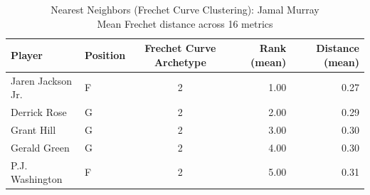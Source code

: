\begin{table}[t]
\caption*{
{\fontsize{20}{25} Nearest Neighbors (Frechet Curve Clustering): Jamal Murray\fontsize{12}{15}\selectfont } \\ 
{\fontsize{14}{17}\selectfont  Mean Frechet distance across 16 metrics\fontsize{12}{15}\selectfont }
} 
\fontsize{12.0pt}{14.0pt}\selectfont
\begin{tabular*}{\linewidth}{@{\extracolsep{\fill}}llcrr}
\toprule
Player & Position & Frechet Curve Archetype & Rank (mean) & Distance (mean) \\ 
\midrule\addlinespace[2.5pt]
Jaren Jackson Jr. & F & 2 & 1.00 & 0.27 \\ 
Derrick Rose & G & 2 & 2.00 & 0.29 \\ 
Grant Hill & G & 2 & 3.00 & 0.30 \\ 
Gerald Green & G & 2 & 4.00 & 0.30 \\ 
P.J. Washington & F & 2 & 5.00 & 0.31 \\ 
\bottomrule
\end{tabular*}
\end{table}

